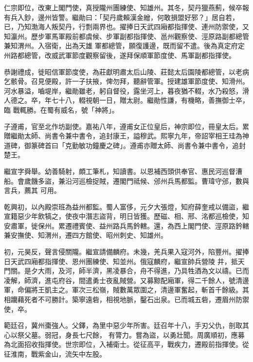 \begin{pinyinscope}
 仁宗即位，改東上閣門使，真授隴州團練使、知雄州。其冬，契丹獵燕薊，候卒報有兵入鈔，邊州皆警。繼勛曰：「契丹歲賴漢金繒，何敢損盟好邪？」居自若，已，乃知渤海人叛契丹，行剽兩界也。擢捧日天武四廂都指揮使、連州防禦使，又知瀛州。歷步軍馬軍殿前都虞候、步軍副都指揮使、邕州觀察使、涇原路副都總管兼知渭州。入宿衛，出為天雄
 軍都總管，願復護邊，既而留不遣。後為真定府定州路都總管，改威武軍節度觀察留後，遂拜保順軍節度使、馬軍副都指揮使。



 恭謝禮成，徙昭信軍節度使，為莊獻明肅太后山陵、莊懿太后園陵都總管，以老病乞骸骨。召見便殿，許一子扶掖，俾勿拜，聽辭管軍。授建雄軍節度使、知滑州。河水暴溢，嚙堤岸，繼勛雖老，躬自督役，露坐河上，暮夜猶不輟，水乃殺怒，滑人德之。卒，年七十八，輟視朝一日，贈太尉。繼勛性謙，有機略，善撫御士卒，臨
 戰輒勝。在蜀有威名，號「神將」。



 子遵甫，官至北作坊副使。嘉祐八年，遵甫女正位皇后，神宗即位，冊皇太后。累贈繼勛太師、尚書令兼中書令，追封康王，謚穆武。熙寧九年，帝詔宰相王珪為神道碑，御篆碑首曰「克勤敏功鐘慶之碑」。遵甫亦贈太師、尚書令兼中書令，追封楚王。



 繼宣字舜舉。幼善騎射，頗工筆札，知讀書。以恩補西頭供奉官、惠民河巡督漕船。會歲饑多盜，兼沿河巡檢捉賊，遷閣門祗候、邠州兵馬都監。曹瑋守邠，數與言兵，薦其
 可用。



 乾興初，以內殿崇班為益州都監。蜀人富侈，元夕大張燈，知府薛奎戒以備盜，繼宣籍惡少年飲犒之，使夜中潛志盜背，明日皆獲。歷磁、相、邢、洺都巡檢使，知安肅軍，徙保州。累遷禮賓使、益州路兵馬鈐轄。還，為西上閣門使、涇原路鈐轄兼安撫使、知渭州，遷四方館使、昭州刺史、知雄州。



 初，元昊反，聲言侵關隴。繼宣請備麟府。未幾，羌兵果入寇河外，陷豐州。擢捧日天武四廂都指揮使、恩州團練使、知並州。俄寇麟府，繼宣帥兵營陵
 井，抵天門關。是夕大雨，及河，師半濟，黑凌暴合，舟不得進，乃具牲酒為文以禱。已而凌解，師濟，進屯府谷，間遣勇士夜亂賊營。又募黥配廂軍，得二千餘人，號清邊軍，命偏將王凱主之。軍次三松嶺，賊數萬眾圍之，清邊軍奮起，斬首千餘級。其相躪藉死者不可勝計。築寧遠砦，相視地脈，鑿石出泉。已而城五砦，遷眉州防禦使，卒。



 範廷召，冀州棗強人。父鐸，為里中惡少年所害。廷召年十八，手刃父仇，剖取其心以祭父墓。弱冠，身長七尺餘，
 有膂力。嘗為盜，以勇壯聞。周廣順初，應募為北面招收指揮使。世宗即位，入補衛士。從征高平，戰疾力，遷殿前指揮使。從征淮南，戰紫金山，流矢中左股。




\end{pinyinscope}
